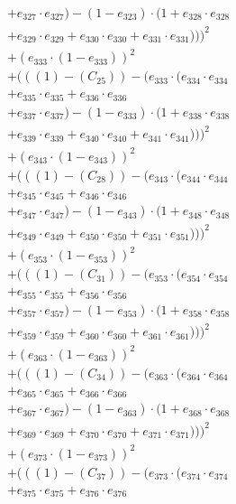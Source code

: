 \documentclass[10pt, a4paper]{article}
\begin{document}
\begin{align*}
& + e_{327} \cdot e_{327}) - (1 - e_{323}) \cdot (1 + e_{328} \cdot e_{328} \\
& + e_{329} \cdot e_{329} + e_{330} \cdot e_{330} + e_{331} \cdot e_{331})))^{2} \\
& + (e_{333} \cdot (1 - e_{333}))^{2} \\
& + (((1) - (C_{25})) - (e_{333} \cdot (e_{334} \cdot e_{334} \\
& + e_{335} \cdot e_{335} + e_{336} \cdot e_{336} \\
& + e_{337} \cdot e_{337}) - (1 - e_{333}) \cdot (1 + e_{338} \cdot e_{338} \\
& + e_{339} \cdot e_{339} + e_{340} \cdot e_{340} + e_{341} \cdot e_{341})))^{2} \\
& + (e_{343} \cdot (1 - e_{343}))^{2} \\
& + (((1) - (C_{28})) - (e_{343} \cdot (e_{344} \cdot e_{344} \\
& + e_{345} \cdot e_{345} + e_{346} \cdot e_{346} \\
& + e_{347} \cdot e_{347}) - (1 - e_{343}) \cdot (1 + e_{348} \cdot e_{348} \\
& + e_{349} \cdot e_{349} + e_{350} \cdot e_{350} + e_{351} \cdot e_{351})))^{2} \\
& + (e_{353} \cdot (1 - e_{353}))^{2} \\
& + (((1) - (C_{31})) - (e_{353} \cdot (e_{354} \cdot e_{354} \\
& + e_{355} \cdot e_{355} + e_{356} \cdot e_{356} \\
& + e_{357} \cdot e_{357}) - (1 - e_{353}) \cdot (1 + e_{358} \cdot e_{358} \\
& + e_{359} \cdot e_{359} + e_{360} \cdot e_{360} + e_{361} \cdot e_{361})))^{2} \\
& + (e_{363} \cdot (1 - e_{363}))^{2} \\
& + (((1) - (C_{34})) - (e_{363} \cdot (e_{364} \cdot e_{364} \\
& + e_{365} \cdot e_{365} + e_{366} \cdot e_{366} \\
& + e_{367} \cdot e_{367}) - (1 - e_{363}) \cdot (1 + e_{368} \cdot e_{368} \\
& + e_{369} \cdot e_{369} + e_{370} \cdot e_{370} + e_{371} \cdot e_{371})))^{2} \\
& + (e_{373} \cdot (1 - e_{373}))^{2} \\
& + (((1) - (C_{37})) - (e_{373} \cdot (e_{374} \cdot e_{374} \\
& + e_{375} \cdot e_{375} + e_{376} \cdot e_{376} \\

\end{align*}
\end{document}
